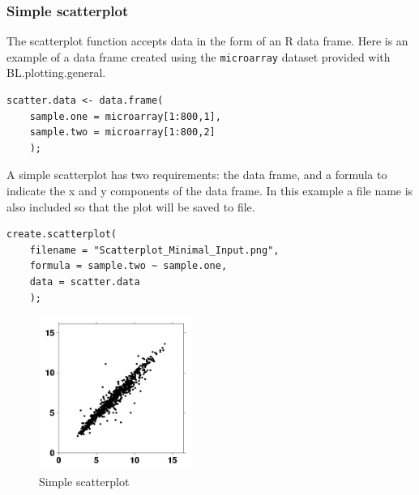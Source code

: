 \documentclass[letterpaper]{article}
\begin{document}
\subsubsection{Simple scatterplot}
The scatterplot function accepts data in the form of an R  data frame. Here is an example of a data frame created using the \verb|microarray| dataset provided with BL.plotting.general.
\begin{verbatim}
scatter.data <- data.frame(
    sample.one = microarray[1:800,1],
    sample.two = microarray[1:800,2]
    );
\end{verbatim}

A simple scatterplot has two requirements: the data frame, and a formula to indicate the x and y components of the data frame. In this example a file name is also included so that the plot will be saved to file.
\begin{verbatim}
create.scatterplot(
    filename = "Scatterplot_Minimal_Input.png",
    formula = sample.two ~ sample.one,
    data = scatter.data
    );
\end{verbatim}
\begin{figure}[!ht]
  \begin{center}
     \includegraphics[width=50mm]{Figures/Scatterplot_Minimal_Input.png}
     \caption{Simple scatterplot}
  \end{center}
\end{figure}
\end{document}
